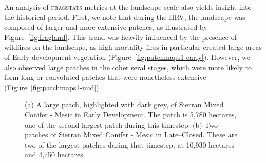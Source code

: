 

An analysis of \textsc{fragstats} metrics at the landscape scale also yields insight into the historical period. First, we note that during the HRV, the landscape was composed of larger and more extensive patches, as illustrated by Figure~\ref{fig:fragland}. This trend was heavily influenced by the presence of wildfires on the landscape, as high mortality fires in particular created large areas of Early development vegetation (Figure~\ref{fig:patchmaps1-early}). However, we also observed large patches in the other seral stages, which were more likely to form long or convoluted patches that were nonetheless extensive (Figure~\ref{fig:patchmaps1-mid}).

\begin{figure}[!htbp]
  \centering
  \caption{(a) A large patch, highlighted with dark grey, of Sierran Mixed Conifer - Mesic in Early Development. The patch is 5,780 hectares, one of the second-largest patch during this timestep. (b) Two patches of Sierran Mixed Conifer - Mesic in Late--Closed. These are two of the largest patches during that timestep, at 10,930 hectares and 4,750 hectares.} 
  \label{fig:patchmaps1}
\end{figure}


